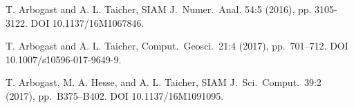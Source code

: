 \documentclass[usenames,dvipsnames,letterpaper,landscape,final]{slides}
\begin{document}
\begin{myslideNoPage}

\begin{nlist}
\item T. Arbogast and A. L. Taicher,  SIAM J.\ Numer.\ Anal. 54:5 (2016), pp. 3105-3122. DOI 10.1137/16M1067846.

\item T. Arbogast and A. L. Taicher, 
  Comput.\ Geosci.\ 21:4 (2017), pp.~701--712. DOI 10.1007/s10596-017-9649-9.

\item T. Arbogast, M. A. Hesse, and A. L. Taicher,  SIAM J.\
  Sci.\ Comput.\ 39:2 (2017), pp.~B375--B402. DOI 10.1137/16M1091095.
\end{nlist}

\end{myslideNoPage}
\end{document}
